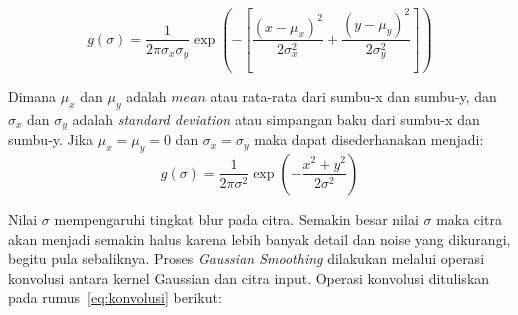 \begin{equation*}
g(\sigma) = \frac{1}{2\pi\sigma_{x}\sigma_{y}}\exp\left(-\left[\frac{(x - \mu_{x})^{2}}{2\sigma_{x}^2} + \frac{(y - \mu_{y})^{2}}{2\sigma_{y}^2}\right]\right)
\end{equation*}

Dimana \(\mu_{x}\) dan \(\mu_{y}\) adalah \(mean\) atau rata-rata dari sumbu-x dan sumbu-y, dan \(\sigma_{x}\) dan \(\sigma_{y}\) adalah \emph{standard deviation} atau simpangan baku dari sumbu-x dan sumbu-y. Jika \(\mu_{x} = \mu_{y} = 0\) dan \(\sigma_{x} = \sigma_{y}\) maka dapat disederhanakan menjadi:
\begin{equation}
g(\sigma) = \frac{1}{2\pi\sigma^2}\exp\left(-\frac{x^2+y^2}{2\sigma^2}\right)
\label{eq:gaussian kernel}
\end{equation}

Nilai \(\sigma\) mempengaruhi tingkat blur pada citra. Semakin besar nilai \(\sigma\) maka citra akan menjadi semakin halus karena lebih banyak detail dan noise yang dikurangi, begitu pula sebaliknya.
Proses \emph{Gaussian Smoothing} dilakukan melalui operasi konvolusi antara kernel Gaussian dan citra input. Operasi konvolusi dituliskan pada rumus~\ref{eq:konvolusi} berikut:




